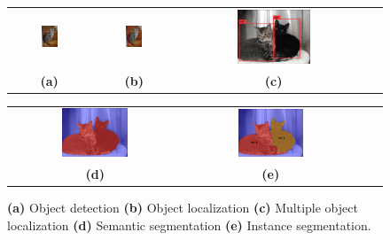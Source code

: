 \begin{figure} [h]
	\centering
	\begin{tabular}{cccc}
		\includegraphics[width=0.223\textwidth]{archivos/cat_classification.png} &
		\includegraphics[width=0.223\textwidth]{archivos/cat_localization.png} &
		\includegraphics[width=0.4\textwidth]{archivos/cats_localization.png} \\
		\textbf{(a)}  & \textbf{(b)} & \textbf{(c)}  \\[6pt]
	\end{tabular}
	\begin{tabular}{cccc}
		\includegraphics[width=0.4\textwidth]{archivos/cats_semantic_segmentation.png} &
		\includegraphics[width=0.4\textwidth]{archivos/cats_instance_segmentation.png} \\
		\textbf{(d)}  & \textbf{(e)}  \\[6pt]
	\end{tabular}
	\caption{ \textbf{(a)} Object detection
		\textbf{(b)} Object localization
		\textbf{(c)} Multiple object localization
		\textbf{(d)} Semantic segmentation
		\textbf{(e)} Instance segmentation.}
	\label{fig:object_recognition}
\end{figure}

